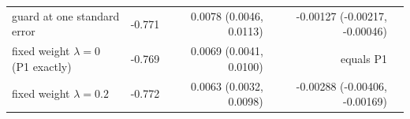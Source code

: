 \begin{tabular}{lrrrrrr}
guard at one standard error & -0.771 &  & 0.0078 (0.0046, 0.0113) &  & -0.00127 (-0.00217, -0.00046) &  \\
fixed weight $\lambda = 0$ (P1 exactly) & -0.769 &  & 0.0069 (0.0041, 0.0100) &  & equals P1 &  \\
fixed weight $\lambda = 0.2$ & -0.772 &  & 0.0063 (0.0032, 0.0098) &  & -0.00288 (-0.00406, -0.00169) &  \\

\end{tabular}
